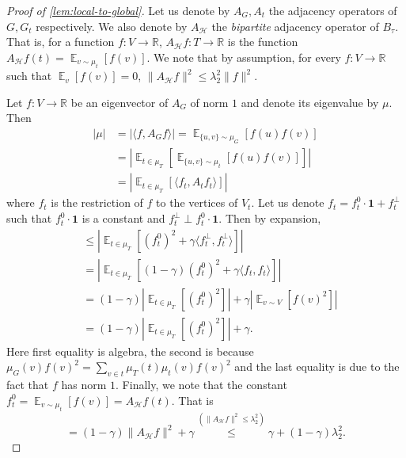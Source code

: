 \documentclass[10pt,a4paper]{article}
\newcommand{\prettyref}[1]{\cref{#1}}
\providecommand{\RR}{\mathbb{R}}
\theoremstyle{definition}
\theoremstyle{remark}
\newcommand{\Brac}[1]{\left[#1\right]}
\newcommand{\abs}[1]{\lvert#1\rvert}
\newcommand{\Abs}[1]{\left\lvert#1\right\rvert}
\newcommand{\set}[1]{\{#1\}}
\newcommand{\norm}[1]{\lVert#1\rVert}
\newcommand{\snorm}[1]{\norm{#1}^2}
\newcommand{\iprod}[1]{\langle#1\rangle}
\newcommand{\Esymb}{\mathbb{E}}
\DeclareMathOperator*{\E}{\Esymb}
\def\one{{\mathbf{1}}}
\newcommand{\Ex}[2][]{\E_{{#1}}\Brac{#2}}
\renewcommand{\leq}{\leqslant}
\renewcommand{\geq}{\geqslant}
\numberwithin{equation}{section}
\let\pref=\prettyref
\def\T{T}
\def\B{\mathcal{H}}
\begin{document}
\begin{proof}[Proof of \pref{lem:local-to-global}]
    Let us denote by \(A_G,A_t\) the adjacency operators of \(G,G_t\) respectively. We also denote by \(A_\B\) the \emph{bipartite} adjacency operator of \(B_\tau\). That is, for a function \(f:V \to \RR\), \(A_\B f:\T \to \RR\) is the function \(A_\B f(t) = \Ex[v \sim \mu_t]{f(v)}\). We note that by assumption, for every \(f:V \to \RR\) such that \(\Ex[v]{f(v)} = 0\), \(\snorm{A_\B f} \leq \lambda_2^2 \snorm{f}\).
    
    Let \(f:V \to \RR\) be an eigenvector of \(A_G\) of norm \(1\) and denote its eigenvalue by \(\mu\). %
    Then
    \begin{align*}
      \abs{\mu} &= \abs{\iprod{f,A_G f}} = \Ex[\set{u,v} \sim \mu_G]{f(u)f(v)} \\
      &= \Abs{\Ex[t \in \mu_\T]{\Ex[\set{u,v} \sim \mu_t]{f(u)f(v)}}} \\
      &= \Abs{\Ex[t \in \mu_\T]{\iprod{f_t,A_t f_t}}}
    \end{align*}
    where \(f_t\) is the restriction of \(f\) to the vertices of \(V_t\). Let us denote \(f_t = f_t^0\cdot \one + f_t^\perp\) such that \(f_t^0\cdot \one\) is a constant and \(f_t^\perp \perp f_t^0 \cdot \one\). Then by expansion,
      \begin{align*}
      &\leq \Abs{\Ex[t \in \mu_\T]{(f_t^0)^2 + \gamma \iprod{f_t^\perp,f_t^\perp}}} \\
      &= \Abs{\Ex[t \in \mu_\T]{(1-\gamma)(f_t^0)^2 + \gamma \iprod{f_t,f_t}}} \\
      & = (1-\gamma)\Abs{\Ex[t \in \mu_\T]{(f_t^0)^2}} + \gamma \Abs{\Ex[v \sim V]{f(v)^2}} \\
      &= (1-\gamma)\Abs{\Ex[t \in \mu_\T]{(f_t^0)^2}} + \gamma.
    \end{align*}
    Here first equality is algebra, the second is because \(\mu_G(v)f(v)^2 = \sum_{v \in t}\mu_\T(t) \mu_t(v)f(v)^2\) and the last equality is due to the fact that \(f\) has norm \(1\). Finally, we note that the constant \(f_t^0 = \Ex[v \sim \mu_t]{f(v)} = A_\B f(t)\). That is
    \[
         = (1-\gamma)\snorm{A_\B f} + \gamma \overset{(\snorm{A_\B f} \leq \lambda_2^2)}{\leq} \gamma + (1-\gamma)\lambda_2^2.
    \]
\end{proof}
\end{document}
